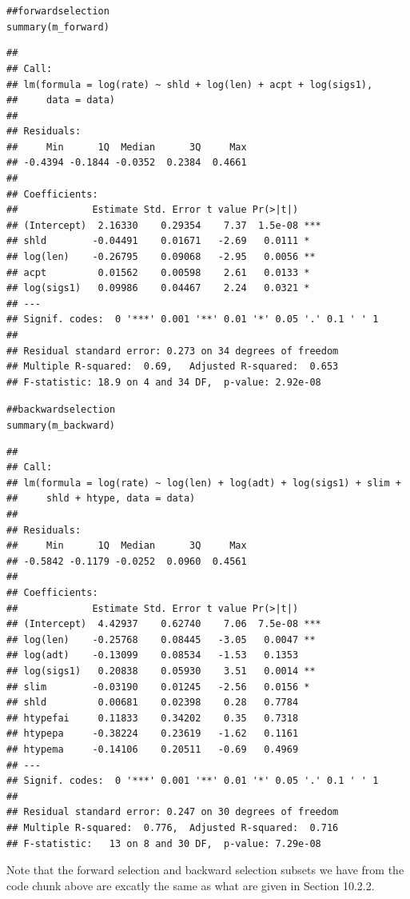 \documentclass[12pt,oneside,a4paper]{article}\usepackage[]{graphicx}\usepackage[]{xcolor}
\makeatletter
\newcommand{\hlcom}[1]{\textcolor[rgb]{0.443,0.478,0.702}{#1}}%
\newcommand{\hlstd}[1]{\textcolor[rgb]{0,0,0}{#1}}%
\newcommand{\hlkwd}[1]{\textcolor[rgb]{0,0,0}{#1}}%
\newenvironment{kframe}{%
 \def\at@end@of@kframe{}%
 \ifinner\ifhmode%
  \def\at@end@of@kframe{\end{minipage}}%
  \begin{minipage}{\columnwidth}%
 \fi\fi%
 \def\FrameCommand##1{\hskip\@totalleftmargin \hskip-\fboxsep
 \colorbox{shadecolor}{##1}\hskip-\fboxsep
     \hskip-\linewidth \hskip-\@totalleftmargin \hskip\columnwidth}%
 \MakeFramed {\advance\hsize-\width
   \@totalleftmargin\z@ \linewidth\hsize
   \@setminipage}}%
 {\par\unskip\endMakeFramed%
 \at@end@of@kframe}
\newenvironment{knitrout}{}{} %
\makeatother
\begin{document}
\begin{knitrout}
\begin{kframe}
\begin{alltt}
\hlcom{## forward selection}
\hlkwd{summary}\hlstd{(m_forward)}
\end{alltt}
\begin{verbatim}
## 
## Call:
## lm(formula = log(rate) ~ shld + log(len) + acpt + log(sigs1), 
##     data = data)
## 
## Residuals:
##     Min      1Q  Median      3Q     Max 
## -0.4394 -0.1844 -0.0352  0.2384  0.4661 
## 
## Coefficients:
##             Estimate Std. Error t value Pr(>|t|)    
## (Intercept)  2.16330    0.29354    7.37  1.5e-08 ***
## shld        -0.04491    0.01671   -2.69   0.0111 *  
## log(len)    -0.26795    0.09068   -2.95   0.0056 ** 
## acpt         0.01562    0.00598    2.61   0.0133 *  
## log(sigs1)   0.09986    0.04467    2.24   0.0321 *  
## ---
## Signif. codes:  0 '***' 0.001 '**' 0.01 '*' 0.05 '.' 0.1 ' ' 1
## 
## Residual standard error: 0.273 on 34 degrees of freedom
## Multiple R-squared:  0.69,	Adjusted R-squared:  0.653 
## F-statistic: 18.9 on 4 and 34 DF,  p-value: 2.92e-08
\end{verbatim}
\begin{alltt}
\hlcom{## backward selection}
\hlkwd{summary}\hlstd{(m_backward)}
\end{alltt}
\begin{verbatim}
## 
## Call:
## lm(formula = log(rate) ~ log(len) + log(adt) + log(sigs1) + slim + 
##     shld + htype, data = data)
## 
## Residuals:
##     Min      1Q  Median      3Q     Max 
## -0.5842 -0.1179 -0.0252  0.0960  0.4561 
## 
## Coefficients:
##             Estimate Std. Error t value Pr(>|t|)    
## (Intercept)  4.42937    0.62740    7.06  7.5e-08 ***
## log(len)    -0.25768    0.08445   -3.05   0.0047 ** 
## log(adt)    -0.13099    0.08534   -1.53   0.1353    
## log(sigs1)   0.20838    0.05930    3.51   0.0014 ** 
## slim        -0.03190    0.01245   -2.56   0.0156 *  
## shld         0.00681    0.02398    0.28   0.7784    
## htypefai     0.11833    0.34202    0.35   0.7318    
## htypepa     -0.38224    0.23619   -1.62   0.1161    
## htypema     -0.14106    0.20511   -0.69   0.4969    
## ---
## Signif. codes:  0 '***' 0.001 '**' 0.01 '*' 0.05 '.' 0.1 ' ' 1
## 
## Residual standard error: 0.247 on 30 degrees of freedom
## Multiple R-squared:  0.776,	Adjusted R-squared:  0.716 
## F-statistic:   13 on 8 and 30 DF,  p-value: 7.29e-08
\end{verbatim}
\end{kframe}
\end{knitrout}

Note that the forward selection and backward selection subsets we have from the code chunk above are excatly the same as what are given in Section 10.2.2.
\end{document}
